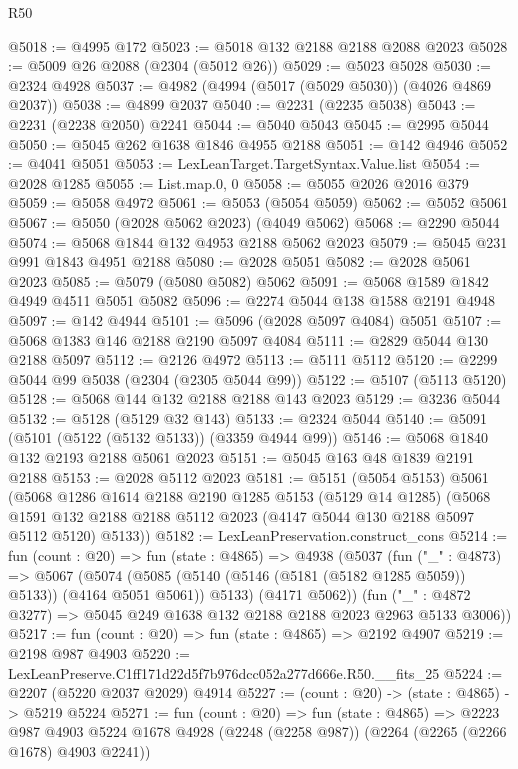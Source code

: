 \begin{lexlean}{R50}
\begin{coremodule}
@5018 := @4995 @172
@5023 := @5018 @132 @2188 @2188 @2088 @2023
@5028 := @5009 @26 @2088 (@2304 (@5012 @26))
@5029 := @5023 @5028
@5030 := @2324 @4928
@5037 := @4982 (@4994 (@5017 (@5029 @5030)) (@4026 @4869 @2037))
@5038 := @4899 @2037
@5040 := @2231 (@2235 @5038)
@5043 := @2231 (@2238 @2050) @2241
@5044 := @5040 @5043
@5045 := @2995 @5044
@5050 := @5045 @262 @1638 @1846 @4955 @2188
@5051 := @142 @4946
@5052 := @4041 @5051
@5053 := LexLeanTarget.TargetSyntax.Value.list
@5054 := @2028 @1285
@5055 := List.map.{0, 0}
@5058 := @5055 @2026 @2016 @379
@5059 := @5058 @4972
@5061 := @5053 (@5054 @5059)
@5062 := @5052 @5061
@5067 := @5050 (@2028 @5062 @2023) (@4049 @5062)
@5068 := @2290 @5044
@5074 := @5068 @1844 @132 @4953 @2188 @5062 @2023
@5079 := @5045 @231 @991 @1843 @4951 @2188
@5080 := @2028 @5051
@5082 := @2028 @5061 @2023
@5085 := @5079 (@5080 @5082) @5062
@5091 := @5068 @1589 @1842 @4949 @4511 @5051 @5082
@5096 := @2274 @5044 @138 @1588 @2191 @4948
@5097 := @142 @4944
@5101 := @5096 (@2028 @5097 @4084) @5051
@5107 := @5068 @1383 @146 @2188 @2190 @5097 @4084
@5111 := @2829 @5044 @130 @2188 @5097
@5112 := @2126 @4972
@5113 := @5111 @5112
@5120 := @2299 @5044 @99 @5038 (@2304 (@2305 @5044 @99))
@5122 := @5107 (@5113 @5120)
@5128 := @5068 @144 @132 @2188 @2188 @143 @2023
@5129 := @3236 @5044
@5132 := @5128 (@5129 @32 @143)
@5133 := @2324 @5044
@5140 := @5091 (@5101 (@5122 (@5132 @5133)) (@3359 @4944 @99))
@5146 := @5068 @1840 @132 @2193 @2188 @5061 @2023
@5151 := @5045 @163 @48 @1839 @2191 @2188
@5153 := @2028 @5112 @2023
@5181 := @5151
    (@5054 @5153)
    @5061
    (@5068
      @1286
      @1614
      @2188
      @2190
      @1285
      @5153
      (@5129 @14 @1285)
      (@5068 @1591 @132 @2188 @2188 @5112 @2023 (@4147 @5044 @130 @2188 @5097 @5112 @5120) @5133))
@5182 := LexLeanPreservation.construct_cons
@5214 := fun (count : @20) =>
  fun (state : @4865) =>
  @4938
    (@5037
      (fun ("_" : @4873) =>
      @5067
        (@5074 (@5085 (@5140 (@5146 (@5181 (@5182 @1285 @5059)) @5133)) (@4164 @5051 @5061)) @5133)
        (@4171 @5062))
      (fun ("_" : @4872 @3277) => @5045 @249 @1638 @132 @2188 @2188 @2023 @2963 @5133 @3006))
@5217 := fun (count : @20) => fun (state : @4865) => @2192 @4907
@5219 := @2198 @987 @4903
@5220 := LexLeanPreserve.C1ff171d22d5f7b976dcc052a277d666e.R50.__fits_25
@5224 := @2207 (@5220 @2037 @2029) @4914
@5227 := (count : @20) -> (state : @4865) -> @5219 @5224
@5271 := fun (count : @20) =>
  fun (state : @4865) =>
  @2223
    @987
    @4903
    @5224
    @1678
    @4928
    (@2248 (@2258 @987))
    (@2264 (@2265 (@2266 @1678) @4903 @2241))

\end{coremodule}
\end{lexlean}
